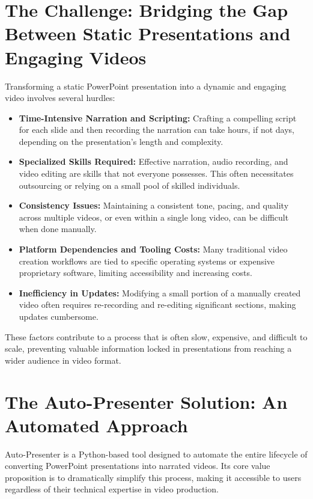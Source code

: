 \documentclass{article}
\begin{document}
\section{The Challenge: Bridging the Gap Between Static Presentations and Engaging Videos}
Transforming a static PowerPoint presentation into a dynamic and engaging video involves several hurdles:
\begin{itemize}
    \item \textbf{Time-Intensive Narration and Scripting:} Crafting a compelling script for each slide and then recording the narration can take hours, if not days, depending on the presentation's length and complexity.
    \item \textbf{Specialized Skills Required:} Effective narration, audio recording, and video editing are skills that not everyone possesses. This often necessitates outsourcing or relying on a small pool of skilled individuals.
    \item \textbf{Consistency Issues:} Maintaining a consistent tone, pacing, and quality across multiple videos, or even within a single long video, can be difficult when done manually.
    \item \textbf{Platform Dependencies and Tooling Costs:} Many traditional video creation workflows are tied to specific operating systems or expensive proprietary software, limiting accessibility and increasing costs.
    \item \textbf{Inefficiency in Updates:} Modifying a small portion of a manually created video often requires re-recording and re-editing significant sections, making updates cumbersome.
\end{itemize}
These factors contribute to a process that is often slow, expensive, and difficult to scale, preventing valuable information locked in presentations from reaching a wider audience in video format.

\section{The Auto-Presenter Solution: An Automated Approach}
Auto-Presenter is a Python-based tool designed to automate the entire lifecycle of converting PowerPoint presentations into narrated videos. Its core value proposition is to dramatically simplify this process, making it accessible to users regardless of their technical expertise in video production.
\end{document}
